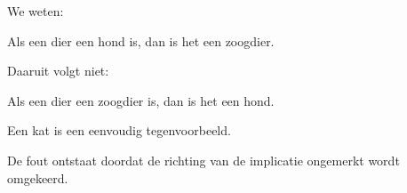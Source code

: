 \documentclass{ximera}
\begin{document}
\begin{voorbeeld}

We weten:

\begin{center}
Als een dier een hond is, dan is het een zoogdier.
\end{center}

Daaruit volgt niet:

\begin{center}
Als een dier een zoogdier is, dan is het een hond.
\end{center}

Een kat is een eenvoudig tegenvoorbeeld.

De fout ontstaat doordat de richting van de implicatie ongemerkt wordt
omgekeerd.

\end{voorbeeld}
\end{document}
